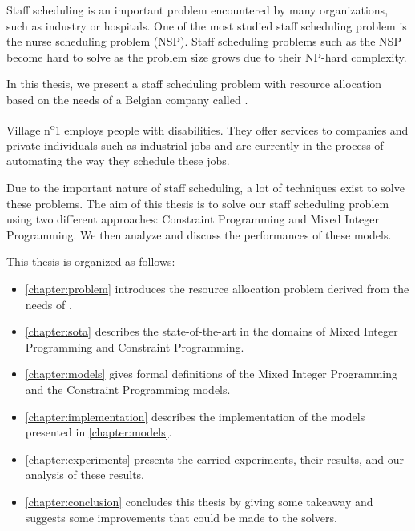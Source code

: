 \documentclass[../thesis.tex]{subfiles}
\begin{document}
Staff scheduling is an important problem encountered by many organizations, such as industry or hospitals.
One of the most studied staff scheduling problem is the nurse scheduling problem (NSP). 
Staff scheduling problems such as the NSP become hard to solve as the problem size grows due to their NP-hard complexity.

In this thesis, we present a staff scheduling problem with resource allocation based on the needs of a Belgian company called \vone.

Village n\textsuperscript{o}1 employs people with disabilities.
They offer services to companies and private individuals such as industrial jobs and
are currently in the process of automating the way they schedule these jobs. 

Due to the important nature of staff scheduling, a lot of techniques exist to solve these problems. 
The aim of this thesis is to solve our staff scheduling problem
using two different approaches: Constraint Programming and Mixed Integer Programming.
We then analyze and discuss the performances of these models.



This thesis is organized as follows:

\begin{itemize}
  \item[] \autoref{chapter:problem} introduces the resource allocation problem derived from the needs of \vone.
  \item[] \autoref{chapter:sota} describes the state-of-the-art in the domains of Mixed Integer Programming and Constraint Programming. 
  \item[] \autoref{chapter:models} gives formal definitions of the Mixed Integer Programming and the Constraint Programming models.
  \item[] \autoref{chapter:implementation} describes the implementation of the models presented in \autoref{chapter:models}.
  \item[] \autoref{chapter:experiments} presents the carried experiments, their results, and our analysis of these results.
  \item[] \autoref{chapter:conclusion} concludes this thesis by giving some takeaway and suggests some improvements that could be made to the solvers.
\end{itemize}
\end{document}
